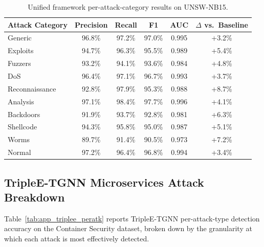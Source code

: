 \begin{table}[htbp]
\centering
\caption{Unified framework per-attack-category results on UNSW-NB15.}
\label{tab:app_unsw_peratk}
\begin{tabular}{lccccc}
\toprule
Attack Category & Precision & Recall & F1 & AUC & $\Delta$ vs.\ Baseline \\
\midrule
Generic          & 96.8\% & 97.2\% & 97.0\% & 0.995 & +3.2\% \\
Exploits         & 94.7\% & 96.3\% & 95.5\% & 0.989 & +5.4\% \\
Fuzzers          & 93.2\% & 94.1\% & 93.6\% & 0.984 & +4.8\% \\
DoS              & 96.4\% & 97.1\% & 96.7\% & 0.993 & +3.7\% \\
Reconnaissance   & 92.8\% & 97.9\% & 95.3\% & 0.988 & +8.7\% \\
Analysis         & 97.1\% & 98.4\% & 97.7\% & 0.996 & +4.1\% \\
Backdoors        & 91.9\% & 93.7\% & 92.8\% & 0.981 & +6.3\% \\
Shellcode        & 94.3\% & 95.8\% & 95.0\% & 0.987 & +5.1\% \\
Worms            & 89.7\% & 91.4\% & 90.5\% & 0.973 & +7.2\% \\
\midrule
Normal           & 97.2\% & 96.4\% & 96.8\% & 0.994 & +3.4\% \\
\bottomrule
\end{tabular}
\end{table}


\subsection{TripleE-TGNN Microservices Attack Breakdown}
\label{app:triplee_detail}

Table~\ref{tab:app_triplee_peratk} reports TripleE-TGNN per-attack-type detection accuracy on the Container Security dataset, broken down by the granularity at which each attack is most effectively detected.

